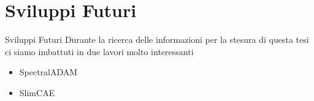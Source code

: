 \section{Sviluppi Futuri}

    \begin{frame}{Sviluppi Futuri}
        Durante la ricerca delle informazioni per la stesura di questa tesi ci siamo imbattuti in due lavori molto interessanti
        \begin{itemize}
            \item SpectralADAM\footnotemark[1]
            \item SlimCAE\footnotemark[2]
        \end{itemize}
    \end{frame}
    